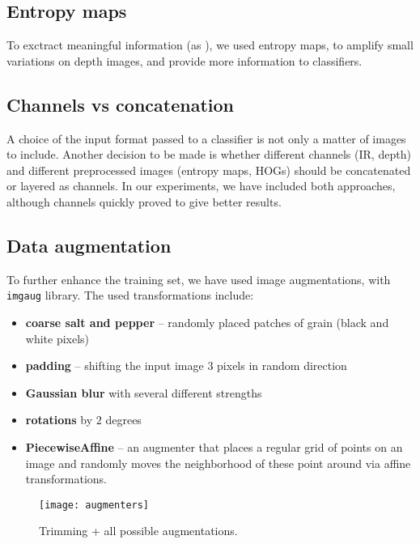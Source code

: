         \subsection*{Entropy maps}
        To exctract meaningful information (as \citeauthor{rgbdhog}),
        we used entropy maps, to amplify small variations on depth images, and provide
        more information to classifiers.

        \subsection*{Channels vs concatenation}
        A choice of the input format passed to a classifier is not only a matter
        of images to include. Another decision to be made is whether different
        channels (IR, depth) and different preprocessed images (entropy maps,
        HOGs) should be concatenated or layered as channels. In our experiments,
        we have included both approaches, although channels quickly proved to
        give better results.

        \subsection*{Data augmentation}
        To further enhance the training set, we have used image augmentations, with \texttt{imgaug} \cite{imgaug} library.
        The used transformations include:
        \begin{itemize}
            \item \textbf{coarse salt and pepper} -- randomly placed patches of grain (black and white pixels)
            \item \textbf{padding} -- shifting the input image $3$ pixels in random direction
            \item \textbf{Gaussian blur} with several different strengths
            \item \textbf{rotations} by $2$ degrees
            \item \textbf{PiecewiseAffine} -- an augmenter that places a regular grid of points on an image and randomly moves the neighborhood of these point around via affine transformations.
        \end{itemize}
        \begin{figure}[H]
        \caption{Trimming + all possible augmentations.}
        \centering
        \texttt{[image: augmenters]}
        \end{figure}

